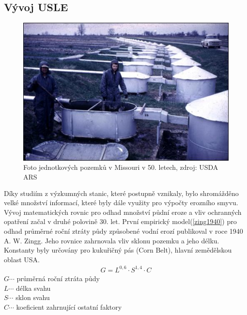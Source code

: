 \subsection{Vývoj USLE}
\begin{figure}[H]
    \centering \includegraphics[scale=0.85]{./pictures/unit_plots.jpg}
      \caption[Foto jednotkových pozemků v Missouri v 50. letech]{Foto
        jednotkových pozemků v Missouri v 50. letech, zdroj: USDA
        ARS\cite{usda_ars}}
      \label{fig:unit_plots}
\end{figure}
Díky studiím z výzkumných stanic, které postupně vznikaly, bylo
shromážděno velké množství informací, které byly dále využity pro
výpočty erozního smyvu. Vývoj matematických rovnic pro odhad množství
půdní eroze a vliv ochranných opatření začal v druhé polovině
30. let. První empirický model(\ref{zing1940}) pro odhad průměrné
roční ztráty půdy způsobené vodní erozí publikoval v roce 1940
A. W. Zingg. Jeho rovnice zahrnovala vliv sklonu pozemku a jeho
délku. Konstanty byly určovány pro kukuřičný pás (Corn Belt), hlavní
zemědělskou oblast USA.\cite{ZINGG1940}
\begin{align}
   \label{zing1940} G=L^{0,6}\cdot S^{1,4}\cdot C
\end{align}
\hspace*{2cm}$G \cdots$ průměrná roční ztráta půdy\\
\hspace*{2cm}$L \cdots$ délka svahu \\
\hspace*{2cm}$S \cdots$ sklon svahu \\
\hspace*{2cm}$C \cdots$ koeficient zahrnující ostatní faktory\\

